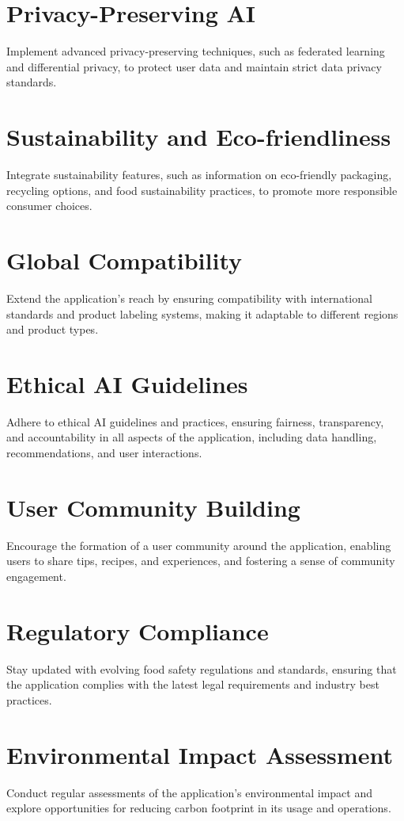\section{Privacy-Preserving AI}
Implement advanced privacy-preserving techniques, such as federated learning and differential privacy, to protect user data and maintain strict data privacy standards.

\section{Sustainability and Eco-friendliness}
Integrate sustainability features, such as information on eco-friendly packaging, recycling options, and food sustainability practices, to promote more responsible consumer choices.

\section{Global Compatibility}
Extend the application's reach by ensuring compatibility with international standards and product labeling systems, making it adaptable to different regions and product types.

\section{Ethical AI Guidelines}
Adhere to ethical AI guidelines and practices, ensuring fairness, transparency, and accountability in all aspects of the application, including data handling, recommendations, and user interactions.

\section{User Community Building}
Encourage the formation of a user community around the application, enabling users to share tips, recipes, and experiences, and fostering a sense of community engagement.

\section{Regulatory Compliance}
Stay updated with evolving food safety regulations and standards, ensuring that the application complies with the latest legal requirements and industry best practices.

\section{Environmental Impact Assessment}
Conduct regular assessments of the application's environmental impact and explore opportunities for reducing carbon footprint in its usage and operations.

